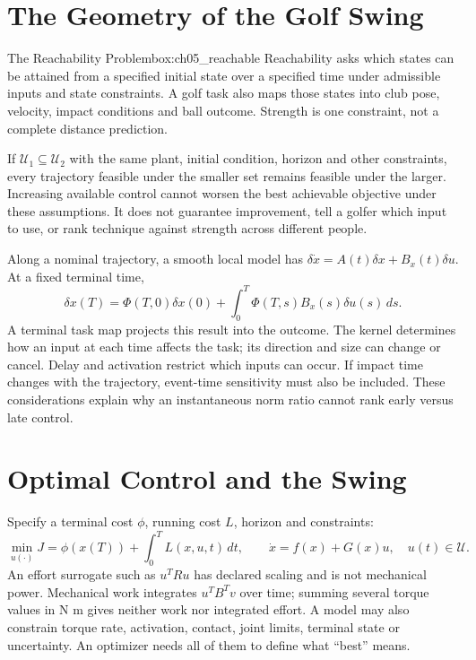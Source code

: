 \section{The Geometry of the Golf Swing}
\begin{constraintbox}{The Reachability Problem}{box:ch05_reachable}
Reachability asks which states can be attained from a specified initial state over a specified time under admissible inputs and state constraints. A golf task also maps those states into club pose, velocity, impact conditions and ball outcome. Strength is one constraint, not a complete distance prediction.

If $\mathcal U_1\subseteq\mathcal U_2$ with the same plant, initial condition, horizon and other constraints, every trajectory feasible under the smaller set remains feasible under the larger. Increasing available control cannot worsen the best achievable objective under these assumptions. It does not guarantee improvement, tell a golfer which input to use, or rank technique against strength across different people.
\end{constraintbox}

Along a nominal trajectory, a smooth local model has $\delta\dot x=A(t)\delta x+B_x(t)\delta u$. At a fixed terminal time,
\[
 \delta x(T)=\Phi(T,0)\delta x(0)+\int_0^T\Phi(T,s)B_x(s)\delta u(s)\,ds.
\]
A terminal task map projects this result into the outcome. The kernel determines how an input at each time affects the task; its direction and size can change or cancel. Delay and activation restrict which inputs can occur. If impact time changes with the trajectory, event-time sensitivity must also be included. These considerations explain why an instantaneous norm ratio cannot rank early versus late control.

\section{Optimal Control and the Swing}
Specify a terminal cost $\phi$, running cost $L$, horizon and constraints:
\[
 \min_{u(\cdot)}J=\phi(x(T))+\int_0^T L(x,u,t)\,dt,\qquad
 \dot x=f(x)+G(x)u,\quad u(t)\in\mathcal U.
\]
An effort surrogate such as $u^TRu$ has declared scaling and is not mechanical power. Mechanical work integrates $u^TB^Tv$ over time; summing several torque values in N m gives neither work nor integrated effort. A model may also constrain torque rate, activation, contact, joint limits, terminal state or uncertainty. An optimizer needs all of them to define what ``best'' means.

